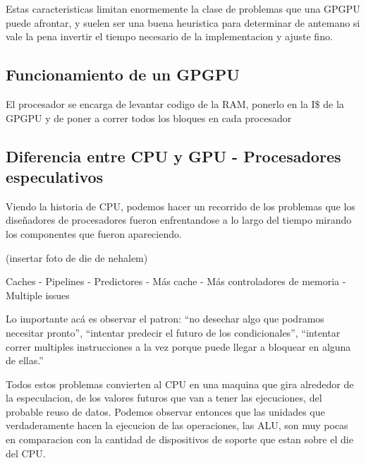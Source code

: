 Estas caracteristicas limitan enormemente la clase de problemas que una GPGPU puede
afrontar, y suelen ser una buena heuristica para determinar de antemano si vale la pena
invertir el tiempo necesario de la implementacion y ajuste fino.

\subsection{Funcionamiento de un GPGPU}
El procesador se encarga de levantar codigo de la RAM, ponerlo en la I\$ de la GPGPU
y de poner a correr todos los bloques en cada procesador


\subsection{Diferencia entre CPU y GPU - Procesadores especulativos}
Viendo la historia de CPU, podemos hacer un recorrido de los problemas que los dise\~nadores de procesadores
fueron enfrentandose a lo largo del tiempo mirando los componentes que fueron apareciendo.

(insertar foto de die de nehalem)

Caches - Pipelines - Predictores - M\'as cache - M\'as controladores de memoria - Multiple issues

Lo importante ac\'a es observar el patron: ``no desechar algo que podramos necesitar pronto'',
``intentar predecir el futuro de los condicionales'', ``intentar correr multiples instrucciones a la vez
porque puede llegar a bloquear en alguna de ellas.''

Todos estos problemas convierten al CPU en una maquina que gira alrededor de la especulacion,
de los valores futuros que van a tener las ejecuciones, del probable reuso de datos.
Podemos observar entonces que las unidades que verdaderamente hacen la ejecucion de las operaciones,
las ALU, son muy pocas en comparacion con la cantidad de dispositivos de soporte que estan
sobre el die del CPU.


